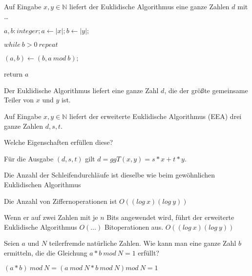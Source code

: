 \documentclass[avery5371, frame]{flashcards}
\begin{document}
\begin{flashcard}[Zahlentheorie]{Auf Eingabe $x,y\in\mathbb{N}$ liefert der Euklidische Algorithmus eine ganze Zahlen $d$ mit \dots}

    \begin{itemize*}
        \item[] $a,b:integer;a\leftarrow |x|;b\leftarrow |y|;$
        \item[] $while\ b> 0\ repeat$
        \begin{itemize*}
            \item[] $(a,b)\leftarrow (b,a\ mod\ b);$ %
        \end{itemize*}
        \item[] return $a$
    \end{itemize*}

    Der Euklidische Algorithmus liefert eine ganze Zahl $d$, die der größte gemeinsame Teiler von $x$ und $y$ ist.
\end{flashcard}

\begin{flashcard}[Zahlentheorie]{Auf Eingabe $x,y\in\mathbb{N}$ liefert der erweiterte Euklidische Algorithmus (EEA) drei ganze Zahlen $d,s,t$.

        Welche Eigenschaften erfüllen diese?}

    \begin{enumerate*}
        \item Für die Ausgabe $(d,s,t)$ gilt $d= ggT(x,y) =s*x+t*y$.
        \item Die Anzahl der Schleifendurchläufe ist dieselbe wie beim gewöhnlichen Euklidischen Algorithmus
        \item Die Anzahl von Ziffernoperationen ist $O((log\ x)(log\ y))$
    \end{enumerate*}
\end{flashcard}

\begin{flashcard}[Zahlentheorie]{Wenn er auf zwei Zahlen mit je $n$ Bits angewendet wird, führt der erweiterte Euklidische Algorithmus $O(\dots)$ Bitoperationen aus.}
    $O((log\ x)(log\ y))$
\end{flashcard}

\begin{flashcard}[Zahlentheorie]{Seien $a$ und $N$ teilerfremde natürliche Zahlen. Wie kann man eine ganze Zahl $b$ ermitteln, die die Gleichung $a*b\ mod\ N= 1$ erfüllt?}

    $(a*b)\ mod\ N = (a\ mod\ N * b\ mod\ N)mod\ N = 1$
\end{flashcard}
\end{document}
